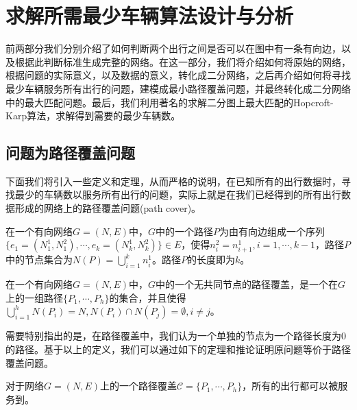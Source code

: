 \section{求解所需最少车辆算法设计与分析}
前两部分我们分别介绍了如何判断两个出行之间是否可以在图中有一条有向边，以及根据此判断标准生成完整的网络。在这一部分，我们将介绍如何将原始的网络，根据问题的实际意义，以及数据的意义，转化成二分网络，之后再介绍如何将寻找最少车辆服务所有出行的问题，建模成最小路径覆盖问题，并最终转化成二分网络中的最大匹配问题。最后，我们利用著名的求解二分图上最大匹配的Hopcroft-Karp算法，求解得到需要的最少车辆数。
\subsection{问题为路径覆盖问题}
下面我们将引入一些定义和定理，从而严格的说明，在已知所有的出行数据时，寻找最少的车辆数以服务所有出行的问题，实际上就是在我们已经得到的所有出行数据形成的网络上的路径覆盖问题(path cover)。
\begin{definition}[路径]
在一个有向网络$G = (N, E)$中，$G$中的一个路径$P$为由有向边组成一个序列$\{e_1 = (N_1^1, N_1^2),\cdots, e_k = (N_k^1,N_k^2)\}\in E$，使得$n_i^2 = n_{i+1}^1, i = 1,\cdots, k-1$，路径$P$中的节点集合为$N(P) = \bigcup_{i=1}^k n_i^1$。路径$P$的长度即为$k$。
\end{definition}

\begin{definition}[路径覆盖]
在一个有向网络$G = (N, E)$中，$G$中的一个无共同节点的路径覆盖，是一个在$G$上的一组路径$\{P_1, \cdots, P_h\}$的集合，并且使得$\bigcup_{i=1}^h N(P_i) = N, N(P_i)\cap N(P_j) = \emptyset, i\neq j$。
\end{definition}
\par
需要特别指出的是，在路径覆盖中，我们认为一个单独的节点为一个路径长度为0的路径。基于以上的定义，我们可以通过如下的定理和推论证明原问题等价于路径覆盖问题。
\begin{theorem}\label{theo:path}
对于网络$G = (N, E)$上的一个路径覆盖$\mathcal{C} = \{P_1,\cdots, P_h\}$，所有的出行都可以被服务到。
\end{theorem}

